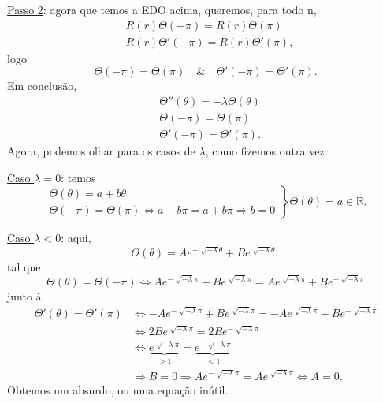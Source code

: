\documentclass[../pde_notes.tex]{subfiles}
\begin{document}
{\color{VioletRed4}\underline{Passo 2}}: agora que temos a EDO acima, queremos, para todo n,
\begin{align*}
	 & R(r)\Theta (-\pi ) = R(r)\Theta (\pi )   \\
	 & R(r)\Theta '(-\pi ) = R(r)\Theta '(\pi),
\end{align*}
logo
\[
	\Theta (-\pi ) = \Theta (\pi ) \quad\&\quad \Theta '(-\pi ) = \Theta '(\pi ).
\]
Em conclusão,
\begin{align*}
	 & \Theta ''(\theta )=-\lambda \Theta (\theta ) \\
	 & \Theta (-\pi ) = \Theta (\pi )               \\
	 & \Theta'(-\pi ) = \Theta '(\pi ).
\end{align*}
Agora, podemos olhar para os casos de \(\lambda \), como fizemos outra vez

\underline{Caso \(\lambda  = 0\)}: temos
\[
	\left.\begin{array}{ll}
		\Theta (\theta ) = a + b\theta \\
		\Theta (-\pi ) = \Theta (\pi ) \Leftrightarrow a-b\pi =a+b\pi \Rightarrow b = 0
	\end{array}\right\} \Theta (\theta ) = a\in \mathbb{R}.
\]

\underline{Caso \(\lambda < 0\)}: aqui,
\[
	\Theta (\theta ) = Ae^{-\sqrt[]{-\lambda }\theta } + B e^{\sqrt[]{-\lambda }\theta },
\]
tal que
\[
	\Theta (\theta ) = \Theta (-\pi ) \Longleftrightarrow Ae^{-\sqrt[]{-\lambda }\pi } + Be^{\sqrt[]{-\lambda }\pi } = Ae^{\sqrt[]{-\lambda }\pi } + B e^{-\sqrt[]{-\lambda }\pi }
\]
junto à
\begin{align*}
	\Theta '(\theta ) = \Theta '(\pi ) & \Longleftrightarrow -A e^{-\sqrt[]{-\lambda }\pi }+Be^{\sqrt[]{-\lambda }\pi } = -Ae^{\sqrt[]{-\lambda }\pi }+Be^{-\sqrt[]{-\lambda }\pi } \\
	                                   & \Longleftrightarrow                     2Be^{\sqrt[]{-\lambda }\pi } = 2Be^{-\sqrt[]{-\lambda }\pi }                                       \\
	                                   & \Longleftrightarrow \underbrace{e^{\sqrt[]{-\lambda }\pi }}_{>1} = \underbrace{e^{-\sqrt[]{-\lambda }\pi }}_{<1}                           \\
	                                   & \Rightarrow B = 0 \Rightarrow Ae^{-\sqrt[]{-\lambda }\pi } = Ae^{\sqrt[]{-\lambda }\pi }\Longleftrightarrow A = 0.
\end{align*}
Obtemos um absurdo, ou uma equação inútil.
\end{document}
